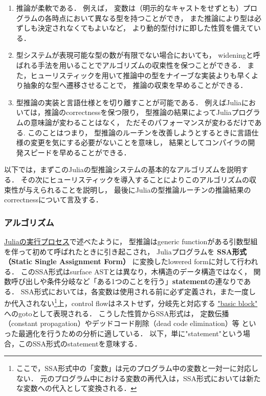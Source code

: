 \begin{enumerate}
  \item 推論が柔軟である．
        例えば，
        変数は（明示的なキャストをせずとも）プログラムの各時点において異なる型を持つことができ，
        また推論により型は必ずしも決定されなくてもよいなど，
        より動的型付けに即した性質を備えている．
  \item 型システムが表現可能な型の数が有限でない場合においても，
        wideningと呼ばれる手法を用いることでアルゴリズムの収束性を保つことができる．
        また，ヒューリスティックを用いて推論中の型をナイーブな実装よりも早くより抽象的な型へ遷移させることで，
        推論の収束を早めることができる．
  \item 型推論の実装と言語仕様とを切り離すことが可能である．
        例えばJuliaにおいては，推論のcorrectnessを保つ限り，
        型推論の結果によってJuliaプログラムの意味論が変わることはなく，
        ただそのパフォーマンスが変わるだけである.
        このことはつまり，
        型推論のルーチンを改善しようとするときに言語仕様の変更を気にする必要がないことを意味し，
        結果としてコンパイラの開発スピードを早めることができる．
\end{enumerate}

以下では，まずこのJuliaの型推論システムの基本的なアルゴリズムを説明する．
その次にヒューリスティックを導入することによりこのアルゴリズムの収束性が与えられることを説明し，
最後にJuliaの型推論ルーチンの推論結果のcorrectnessについて言及する．

\subsubsection{アルゴリズム} \label{subsubsection:inference-algorithm}

\hyperref[subsubsection:eval-process]{Juliaの実行プロセス}で述べたように，
型推論はgeneric functionがある引数型組を伴って初めて呼ばれたときに引き起こされ，
Juliaプログラムを
\textbf{SSA形式（Static Single Assignment Form）}\cite{julia-ssa}
に変換したlowered formに対して行われる．
このSSA形式はsurface ASTとは異なり，木構造のデータ構造ではなく，
関数呼び出しや条件分岐など「ある1つのことを行う」\textbf{statement}の連なりである．
SSA形式においては，各変数は使用される前に必ず定義され，また一度しか代入されない\footnote{
  ここで，SSA形式中の「変数」は元のプログラム中の変数と一対一に対応しない．
  元のプログラム中における変数の再代入は，SSA形式においては新たな変数への代入として変換される．
}上，control flowはネストせず，分岐先と対応する
\href{https://en.wikipedia.org/wiki/Basic_block}{"basic block"}
へのgotoとして表現される．
こうした性質からSSA形式は，
定数伝播（constant propagation）やデッドコード削除（dead code elimination）等
といった最適化を行うための分析に適している．
以下，単に"statement"という場合，このSSA形式のstatementを意味する．

